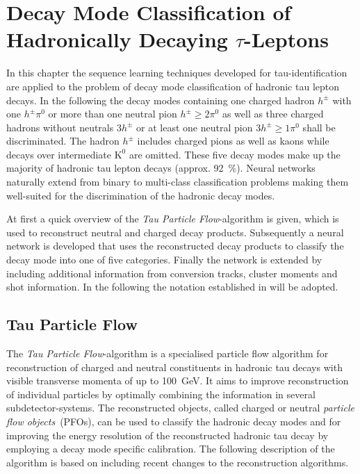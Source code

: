 \chapter{Decay Mode Classification of Hadronically Decaying $\tau$-Leptons}
\label{sec:decaymode}

In this chapter the sequence learning techniques developed for
tau-identification are applied to the problem of decay mode classification of
hadronic tau lepton decays. In the following the decay modes containing one
charged hadron $h^\pm$ with one $h^\pm \pi^0$ or more than one neutral pion
$h^\pm \geq 2\pi^0$ as well as three charged hadrons without neutrals $3h^\pm$
or at least one neutral pion $3h^\pm \geq 1\pi^0$ shall be discriminated. The
hadron $h^\pm$ includes charged pions as well as kaons while decays over
intermediate $\text{K}^0$ are omitted. These five decay modes make up the
majority of hadronic tau lepton decays (approx. \SI{92}{\percent}). Neural
networks naturally extend from binary to multi-class classification problems
making them well-suited for the discrimination of the hadronic decay modes.

At first a quick overview of the \emph{Tau Particle Flow}-algorithm is given,
which is used to reconstruct neutral and charged decay products. Subsequently a
neural network is developed that uses the reconstructed decay products to
classify the decay mode into one of five categories. Finally the network is
extended by including additional information from conversion tracks, cluster
moments and shot information. In the following the notation established in
\cite{atlas:taurec:decaymodes} will be adopted.


\section{Tau Particle Flow}
\label{sec:tau_pflow}

The \emph{Tau Particle Flow}-algorithm is a specialised particle flow algorithm
for reconstruction of charged and neutral constituents in hadronic tau decays
with visible transverse momenta of up to \SI{100}{\giga\electronvolt}. It aims
to improve reconstruction of individual particles by optimally combining the
information in several subdetector-systems. The reconstructed objects, called
charged or neutral \emph{particle flow objects}~(PFOs), can be used to classify
the hadronic decay modes and for improving the energy resolution of the
reconstructed hadronic tau decay by employing a decay mode specific calibration.
The following description of the algorithm is based on
\cite{atlas:taurec:decaymodes} including recent changes to the reconstruction
algorithms.

